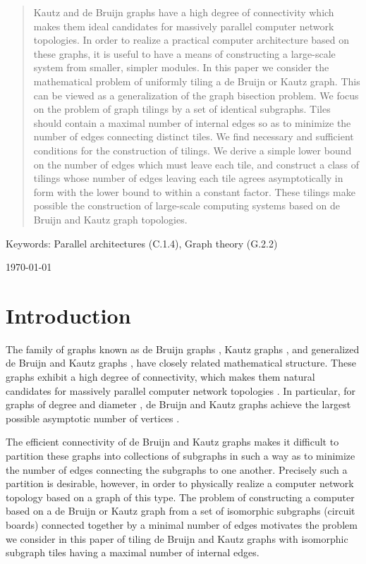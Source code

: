 \documentclass[12pt]{article}
\begin{document}
\begin{titlepage}
\begin{abstract}
Kautz and de Bruijn graphs have
a high degree of connectivity which makes them ideal candidates for
massively parallel computer network topologies.  In order to realize a
practical computer architecture based on these graphs, it is useful to
have a means of constructing a large-scale system from smaller,
simpler modules.  In this paper we consider the mathematical problem
of uniformly tiling a de Bruijn or Kautz graph.  This can be viewed as
a generalization of the graph bisection problem.  We focus on the
problem of graph tilings by a set of identical subgraphs.  Tiles
should contain a maximal number of internal edges so as to minimize
the number of edges connecting distinct tiles.  We find necessary and
sufficient conditions for the construction of tilings.  We derive a
simple lower bound on the number of edges which must leave each tile,
and construct a class of tilings whose number of edges leaving each
tile agrees asymptotically in form with the lower bound to within a
constant factor.  These tilings make possible the construction of
large-scale computing systems based on de Bruijn and Kautz graph
topologies.
\end{abstract}
\vspace*{0.2in}
Keywords: Parallel architectures (C.1.4), Graph theory (G.2.2)

\vspace{1cm}
\begin{flushleft}
\today
\end{flushleft}
\end{titlepage}
\newpage


\section{Introduction}

The family of graphs known as de Bruijn graphs
\cite{db},
Kautz graphs \cite{Kautz}, and generalized de Bruijn and Kautz graphs
\cite{ii1, ii2, rpk, dch}, have closely
related mathematical structure.  These graphs exhibit a high degree of
connectivity, which makes them natural candidates for massively
parallel computer network topologies \cite{bp}.  In particular, for
graphs of degree  and diameter , de Bruijn and Kautz graphs
achieve the largest possible asymptotic number of vertices  \cite{pz}.

The efficient connectivity of de Bruijn and Kautz graphs makes it
difficult to partition these graphs into collections of subgraphs in
such a way as to minimize the number of edges connecting the subgraphs
to one another.  Precisely such a partition is desirable, however, in
order to physically realize a computer network topology based on a
graph of this type.  The problem of constructing a computer based on a
de Bruijn or Kautz graph from a set of isomorphic subgraphs (circuit
boards) connected together by a minimal number of edges motivates the
problem we consider in this paper of tiling de Bruijn and Kautz graphs
with isomorphic subgraph tiles having a maximal number of internal
edges.
\end{document}
